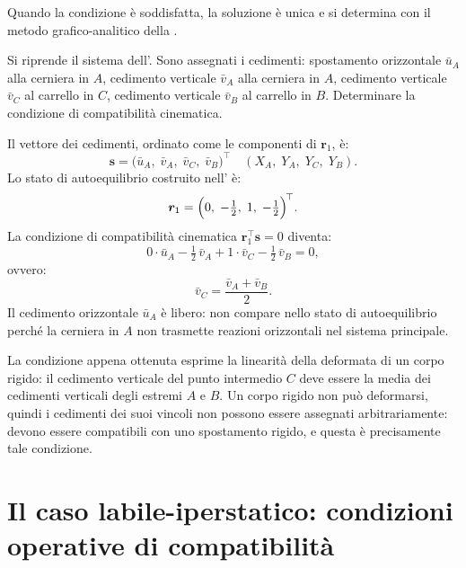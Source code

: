 Quando la condizione è soddisfatta, la soluzione è unica e si
determina con il metodo grafico-analitico della
.

\begin{esempio}
	\label{ex:iper_cin}
	Si riprende il sistema dell'.
	Sono assegnati i cedimenti: spostamento orizzontale
	$\bar{u}_A$ alla cerniera in $A$, cedimento verticale
	$\bar{v}_A$ alla cerniera in $A$, cedimento verticale
	$\bar{v}_C$ al carrello in $C$, cedimento verticale
	$\bar{v}_B$ al carrello in $B$. Determinare la condizione
	di compatibilità cinematica.
	
	
	\begin{svolgimento}
		
		Il vettore dei cedimenti, ordinato come le componenti
		di $\bm{r}_1$, è:
		\[
		\bm{s} =
		\bigl(\bar{u}_A,\;\bar{v}_A,\;\bar{v}_C,\;
		\bar{v}_B\bigr)^{\!\top}
		\quad
		(X_A,\;Y_A,\;Y_C,\;Y_B).
		\]
		Lo stato di autoequilibrio costruito
		nell' è:
		\[
		\bm{r}_1 =
		\Bigl(0,\;-\tfrac{1}{2},\;1,\;
		-\tfrac{1}{2}\Bigr)^{\!\top}.
		\]
		La condizione di compatibilità cinematica
		$\bm{r}_1^{\top}\bm{s} = 0$ diventa:
		\[
		0 \cdot \bar{u}_A
		- \tfrac{1}{2}\,\bar{v}_A
		+ 1 \cdot \bar{v}_C
		- \tfrac{1}{2}\,\bar{v}_B = 0,
		\]
		ovvero:
		\[
		\bar{v}_C = \frac{\bar{v}_A + \bar{v}_B}{2}.
		\]
		Il cedimento orizzontale $\bar{u}_A$ è libero: non compare
		nello stato di autoequilibrio perché la cerniera in $A$
		non trasmette reazioni orizzontali nel sistema principale.
		
		La condizione appena ottenuta esprime la linearità della
		deformata di un corpo rigido: il cedimento verticale del
		punto intermedio $C$ deve essere la media dei cedimenti
		verticali degli estremi $A$ e $B$. Un corpo rigido non
		può deformarsi, quindi i cedimenti dei suoi vincoli non
		possono essere assegnati arbitrariamente: devono essere
		compatibili con uno spostamento rigido, e questa è
		precisamente tale condizione.
		
	\end{svolgimento}
\end{esempio}

\section{Il caso labile-iperstatico: condizioni operative di compatibilità}
\label{sec:labile_iperstatico}

